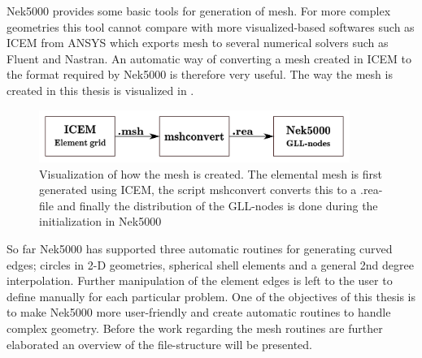 
Nek5000 provides some basic tools for generation of mesh. For more complex geometries this tool cannot compare with more visualized-based softwares 
such as ICEM from ANSYS which exports mesh to several numerical solvers such as Fluent and Nastran.
An automatic way of converting a mesh created in ICEM to the format required by Nek5000 is therefore very useful. 
The way the mesh is created in this thesis is visualized in .
%
\begin{figure}[h]
	\centering
	\includegraphics[width=0.9\textwidth]{Figures/mesh2.pdf}
	\caption{Visualization of how the mesh is created. The elemental mesh is first generated using ICEM, the script mshconvert
    converts this to a .rea-file and finally the distribution of the GLL-nodes is done during the initialization in Nek5000}
	\label{fig:mesh}
\end{figure}
%

So far Nek5000 has supported three automatic routines for generating curved edges;
circles in 2-D geometries, spherical shell elements and a general 2nd degree interpolation.
Further manipulation of the element edges is left to the user to define manually
for each particular problem. One of the objectives of this thesis is to make Nek5000 more
user-friendly and create automatic routines to handle complex geometry. Before the work regarding
the mesh routines are further elaborated an overview of the file-structure will be presented.


